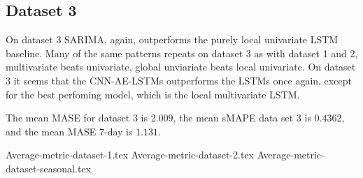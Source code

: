 \subsection{Dataset 3}
On dataset 3 SARIMA, again, outperforms the purely local univariate LSTM baseline.
Many of the same patterns repeats on dataset 3 as with dataset 1 and 2, multivariate beats univariate,
global unviariate beats local univariate.
On dataset 3 it seems that the CNN-AE-LSTMs outperforms the LSTMs once again, except for the
best perfoming model, which is the local multivariate LSTM.

The mean MASE for dataset 3 is $2.009$,
the mean sMAPE data set 3 is $0.4362$,
and the mean MASE 7-day is $1.131$.



{Average-metric-dataset-1.tex}
{Average-metric-dataset-2.tex}
{Average-metric-dataset-seasonal.tex}


